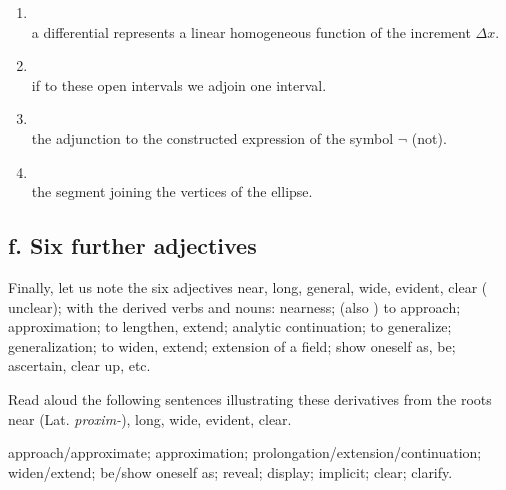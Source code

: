 \begin{enumerate}[label=\arabic*)]
\item {}\\
      a differential represents a linear homogeneous function of the increment $\Delta x$.
\item {}\\
      if to these open intervals we adjoin one interval.
\item {}\\
      the adjunction to the constructed expression of the symbol $\neg$ (not).
\item {}\\
      the segment joining the vertices of the ellipse.
\end{enumerate}

\subsection*{f. Six further adjectives}

Finally, let us note the six adjectives  near,  long,  general,  wide,  evident,  clear ( unclear); with the derived verbs and nouns:  nearness;  (also ) to approach;  approximation;  to lengthen, extend;  analytic continuation;  to generalize;  generalization;  to widen, extend;  extension of a field;  show oneself as, be;  ascertain, clear up, etc.

\begin{keybox}[Exercise 5.12]
Read aloud the following sentences illustrating these derivatives from the roots  near (Lat. \emph{proxim-}),  long,  wide,  evident,  clear.
\end{keybox}

\noindent{} approach/approximate;  approximation;  prolongation/extension/continuation;  widen/extend;  be/show oneself as;  reveal;  display;  implicit;  clear;  clarify.

